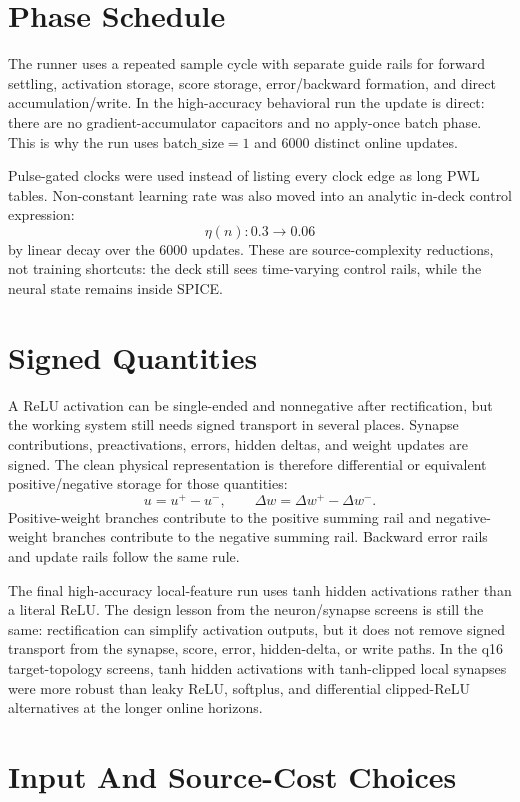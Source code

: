 \documentclass[11pt]{article}
\begin{document}
\section{Phase Schedule}

The runner uses a repeated sample cycle with separate guide rails for forward
settling, activation storage, score storage, error/backward formation, and
direct accumulation/write.  In the high-accuracy behavioral run the update is
direct:
there are no gradient-accumulator capacitors and no apply-once batch phase.
This is why the run uses \(\mathrm{batch\_size}=1\) and 6000 distinct online
updates.

Pulse-gated clocks were used instead of listing every clock edge as long PWL
tables.  Non-constant learning rate was also moved into an analytic in-deck
control expression:
\[
  \eta(n): 0.3 \rightarrow 0.06
\]
by linear decay over the 6000 updates.  These are source-complexity reductions,
not training shortcuts: the deck still sees time-varying control rails, while
the neural state remains inside SPICE.

\section{Signed Quantities}

A ReLU activation can be single-ended and nonnegative after rectification, but
the working system still needs signed transport in several places.  Synapse
contributions, preactivations, errors, hidden deltas, and weight updates are
signed.  The clean physical representation is therefore differential or
equivalent positive/negative storage for those quantities:
\[
  u = u^+ - u^-,
  \qquad
  \Delta w = \Delta w^+ - \Delta w^-.
\]
Positive-weight branches contribute to the positive summing rail and
negative-weight branches contribute to the negative summing rail.  Backward
error rails and update rails follow the same rule.

The final high-accuracy local-feature run uses tanh hidden activations rather
than a literal ReLU.  The design lesson from the neuron/synapse screens is
still the same: rectification can simplify activation outputs, but it does not
remove signed transport from the synapse, score, error, hidden-delta, or write
paths.  In the q16 target-topology screens, tanh hidden activations with
tanh-clipped local synapses were more robust than leaky ReLU, softplus, and
differential clipped-ReLU alternatives at the longer online horizons.

\section{Input And Source-Cost Choices}
\end{document}
